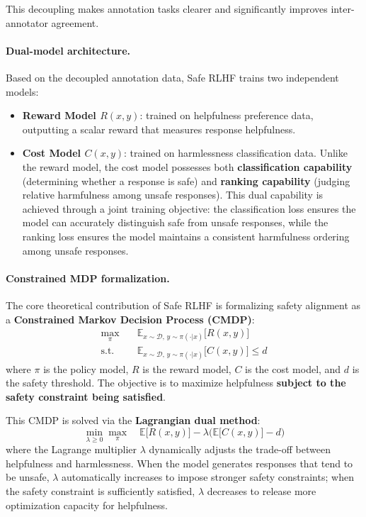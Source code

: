 \noindent
This decoupling makes annotation tasks clearer and significantly improves inter-annotator agreement.

\paragraph{Dual-model architecture.}
Based on the decoupled annotation data, Safe RLHF trains two independent models:
\begin{itemize}[leftmargin=2em]
  \item \textbf{Reward Model $R(x, y)$}: trained on helpfulness preference data,
    outputting a scalar reward that measures response helpfulness.
  \item \textbf{Cost Model $C(x, y)$}: trained on harmlessness classification data.
    Unlike the reward model, the cost model possesses both \textbf{classification capability}
    (determining whether a response is safe) and \textbf{ranking capability} (judging relative harmfulness among unsafe responses).
    This dual capability is achieved through a joint training objective:
    the classification loss ensures the model can accurately distinguish safe from unsafe responses,
    while the ranking loss ensures the model maintains a consistent harmfulness ordering among unsafe responses.
\end{itemize}

\paragraph{Constrained MDP formalization.}
The core theoretical contribution of Safe RLHF is formalizing safety alignment as a
\textbf{Constrained Markov Decision Process (CMDP)}:
\begin{align}
  \max_\pi \quad & \mathbb{E}_{x \sim \mathcal{D},\, y \sim \pi(\cdot|x)} \big[ R(x, y) \big]
  \label{eq:saferlhf-obj} \\
  \text{s.t.} \quad & \mathbb{E}_{x \sim \mathcal{D},\, y \sim \pi(\cdot|x)} \big[ C(x, y) \big] \leq d
  \label{eq:saferlhf-constraint}
\end{align}
where $\pi$ is the policy model, $R$ is the reward model, $C$ is the cost model, and $d$ is the safety threshold.
The objective is to maximize helpfulness \textbf{subject to the safety constraint being satisfied}.

This CMDP is solved via the \textbf{Lagrangian dual method}:
\begin{equation}
  \min_{\lambda \geq 0} \max_\pi \quad
  \mathbb{E}\big[ R(x,y) \big] - \lambda \big( \mathbb{E}\big[ C(x,y) \big] - d \big)
  \label{eq:saferlhf-lagrangian}
\end{equation}
where the Lagrange multiplier $\lambda$ dynamically adjusts the trade-off between helpfulness and harmlessness.
When the model generates responses that tend to be unsafe, $\lambda$ automatically increases to impose stronger safety constraints;
when the safety constraint is sufficiently satisfied, $\lambda$ decreases to release more optimization capacity for helpfulness.

